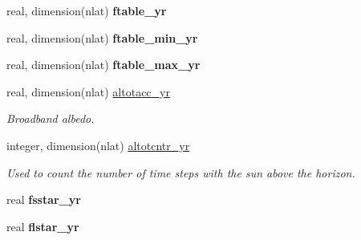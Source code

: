 \begin{DoxyCompactItemize}
\item 
\hypertarget{structctem__statevars_1_1class__moyr__output_a53a13b100ba941cb2dfdbdbb4ebfea57}{}real, dimension(nlat) {\bfseries ftable\+\_\+yr}\label{structctem__statevars_1_1class__moyr__output_a53a13b100ba941cb2dfdbdbb4ebfea57}

\item 
\hypertarget{structctem__statevars_1_1class__moyr__output_a4aad7b8130122483ad4572b64c824978}{}real, dimension(nlat) {\bfseries ftable\+\_\+min\+\_\+yr}\label{structctem__statevars_1_1class__moyr__output_a4aad7b8130122483ad4572b64c824978}

\item 
\hypertarget{structctem__statevars_1_1class__moyr__output_a5342683b4a7001bd8026f6548c459ddc}{}real, dimension(nlat) {\bfseries ftable\+\_\+max\+\_\+yr}\label{structctem__statevars_1_1class__moyr__output_a5342683b4a7001bd8026f6548c459ddc}

\item 
\hypertarget{structctem__statevars_1_1class__moyr__output_a32380d1c52f20d960a938e5fddfe1e84}{}real, dimension(nlat) \hyperlink{structctem__statevars_1_1class__moyr__output_a32380d1c52f20d960a938e5fddfe1e84}{altotacc\+\_\+yr}\label{structctem__statevars_1_1class__moyr__output_a32380d1c52f20d960a938e5fddfe1e84}

\begin{DoxyCompactList}\small\item\em Broadband albedo. \end{DoxyCompactList}\item 
\hypertarget{structctem__statevars_1_1class__moyr__output_a9ed837f2d9b683f9469c1a1fa5c68e15}{}integer, dimension(nlat) \hyperlink{structctem__statevars_1_1class__moyr__output_a9ed837f2d9b683f9469c1a1fa5c68e15}{altotcntr\+\_\+yr}\label{structctem__statevars_1_1class__moyr__output_a9ed837f2d9b683f9469c1a1fa5c68e15}

\begin{DoxyCompactList}\small\item\em Used to count the number of time steps with the sun above the horizon. \end{DoxyCompactList}\item 
\hypertarget{structctem__statevars_1_1class__moyr__output_a61b7693efdd7d3aa645b143d9c98994e}{}real {\bfseries fsstar\+\_\+yr}\label{structctem__statevars_1_1class__moyr__output_a61b7693efdd7d3aa645b143d9c98994e}

\item 
\hypertarget{structctem__statevars_1_1class__moyr__output_a2c170085a3fee4ca9d79a13916077ee0}{}real {\bfseries flstar\+\_\+yr}\label{structctem__statevars_1_1class__moyr__output_a2c170085a3fee4ca9d79a13916077ee0}


\end{DoxyCompactItemize}
